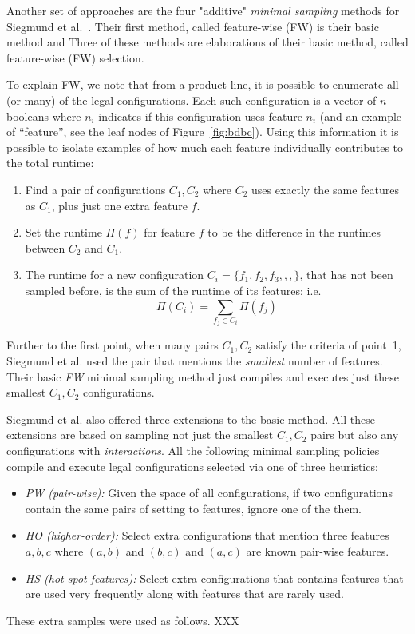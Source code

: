 \documentclass{sig-alternative}
\newcommand{\bi}{\begin{itemize}}%
\newcommand{\ei}{\end{itemize}}
\newcommand{\be}{\begin{enumerate}}
\newcommand{\ee}{\end{enumerate}}
\newcommand{\fig}[1]{Figure~\ref{fig:#1}}
\begin{document}
Another set of approaches are the four "additive" {\em minimal sampling} methods for Siegmund et al.~\cite{siegmund2012predicting}.
Their first method, called feature-wise (FW) is their basic method and 
Three of these methods are    elaborations of their basic method, called feature-wise (FW)
selection.

To explain FW, we note that from a product line, it is possible to enumerate all (or many) of the legal configurations. Each such
configuration is a vector of $n$ booleans where $n_i$ indicates if this configuration uses feature $n_i$ (and
an example of ``feature'', see the leaf nodes of \fig{bdbc}).
Using this information it  is possible to isolate examples of how much each feature individually contributes to the total runtime:
\be
\item Find a pair of  configurations $C_1,C_2$  where $C_2$ uses exactly the same features as $C_1$, plus just one  extra feature $f$.
\item Set the runtime $\Pi(f)$ for feature $f$ to be the difference in the runtimes between $C_2$ and $C_1$.
\item The runtime  for a new configuration  $C_i=\{f_1,f_2,f_3,,,\}$, that has not been sampled before,  is the sum of the runtime of its features; i.e.
\begin{equation}
  \Pi(C_i) = \sum_{f_j \in C_i}\Pi(f_j)  
\end{equation}
\ee

Further to the first point, when many pairs $C_1,C_2$ satisfy the criteria of point~1, Siegmund et al. used the 
pair that mentions the {\em smallest} number of features. Their basic {\em FW} minimal sampling method 
just compiles and executes just these smallest $C_1,C_2$ configurations. 

Siegmund et al. also offered three extensions to the basic method. All these extensions are based on sampling
not just the smallest $C_1,C_2$  pairs but also any configurations with {\em interactions}. 
All the following minimal sampling policies compile and   execute legal configurations selected via one of three heuristics:
\bi
\item[{\em PW (pair-wise):}] Given the space of all configurations, if two configurations contain the same pairs of setting to features, 
ignore one of the them. 
\item[{\em HO (higher-order):}] Select extra configurations that 
mention three features $a,b,c$ where   $(a,b)$ and $(b,c)$ and $(a,c)$ are known pair-wise features.
\item[{\em HS (hot-spot features):}] Select extra configurations that contains features that are used very
frequently along with features that are rarely used. 
\ei
These extra samples were used as follows. XXX
\end{document}
